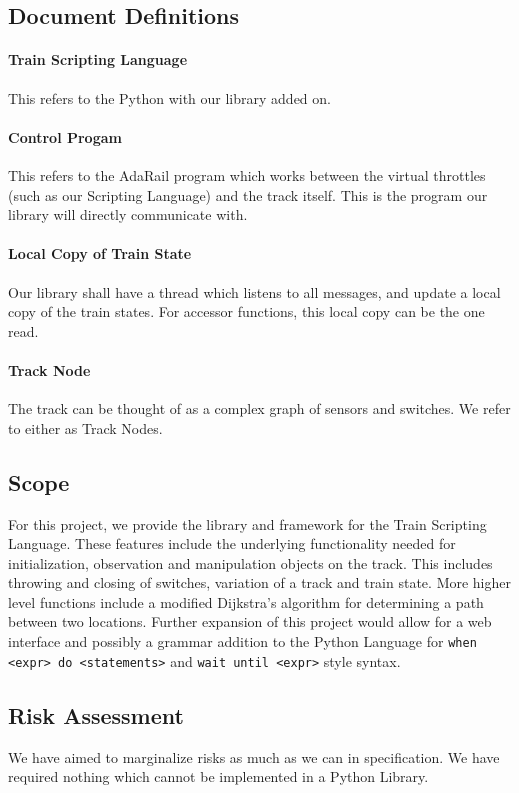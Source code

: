 \documentclass[a4paper,11pt,notitlepage]{article}
\def\TSL{Train Scripting Language\xspace}
\def\CS{Control Progam\xspace}
\def\LC{Local Copy of Train State\xspace}
\def\TN{Track Node\xspace}
\begin{document}
\subsection{Document Definitions}
\paragraph{\TSL} This refers to the Python with our library added on.
\paragraph{\CS} This refers to the AdaRail program which works between the virtual throttles (such as our Scripting Language) and the track itself. This is the program our library will directly communicate with.
\paragraph{\LC} Our library shall have a thread which listens to all messages, and update a local copy of the train states. For accessor functions, this local copy can be the one read.
\paragraph{\TN} The track can be thought of as a complex graph of sensors and switches. We refer to either as \TN{}s.

\newpage
\subsection{Scope}
For this project, we provide the library and framework for the \TSL. These features include the underlying functionality needed for initialization, observation and manipulation objects on the track.  This includes throwing and closing of switches, variation of a track and train state.  More higher level functions include a modified Dijkstra's algorithm for determining a path between two locations.  Further expansion of this project would allow for a web interface and possibly a grammar addition to the Python Language for \verb=when <expr> do <statements>= and \verb=wait until <expr>= style syntax.

\subsection{Risk Assessment}
We have aimed to marginalize risks as much as we can in specification. We have required nothing which cannot be implemented in a Python Library.
\end{document}
